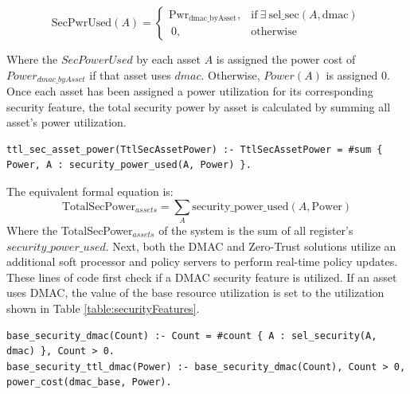 \begin{equation}
\label{eq:SecurityPowerDmac}
\text{SecPwrUsed}(A) = 
\begin{cases} 
\text{Pwr}_{\text{dmac\_byAsset}}, & \text{if} \ \exists \ \text{sel\_sec}(A, \text{dmac}) \\\
0, & \text{otherwise}
\end{cases}
\end{equation}

Where the \(SecPowerUsed\) by each asset \(A\) is assigned the power cost of \(Power_{dmac\_byAsset}\) if that asset uses \(dmac\). Otherwise, \(Power(A)\) is assigned 0.
Once each asset has been assigned a power utilization for its corresponding security feature, the total security power by asset is calculated by summing all asset's power utilization.

\begin{verbatim}
ttl_sec_asset_power(TtlSecAssetPower) :- TtlSecAssetPower = #sum { Power, A : security_power_used(A, Power) }.
\end{verbatim}
The equivalent formal equation is:
\begin{equation}
\label{eq:TotalSecurityPower}
\text{TotalSecPower}_{assets} = \sum_{A} \text{security\_power\_used}(A, \text{Power})
\end{equation}
Where the TotalSecPower\(_{assets}\) of the system is the sum of all register's \(security\_power\_used\).
Next, both the DMAC and Zero-Trust solutions utilize an additional soft processor and policy servers to perform real-time policy updates. These lines of code first check if a DMAC security feature is utilized. If an asset uses DMAC, the value of the base resource utilization is set to the utilization shown in Table \ref{table:securityFeatures}.

\begin{verbatim}
base_security_dmac(Count) :- Count = #count { A : sel_security(A, dmac) }, Count > 0.
base_security_ttl_dmac(Power) :- base_security_dmac(Count), Count > 0, power_cost(dmac_base, Power).
\end{verbatim}

